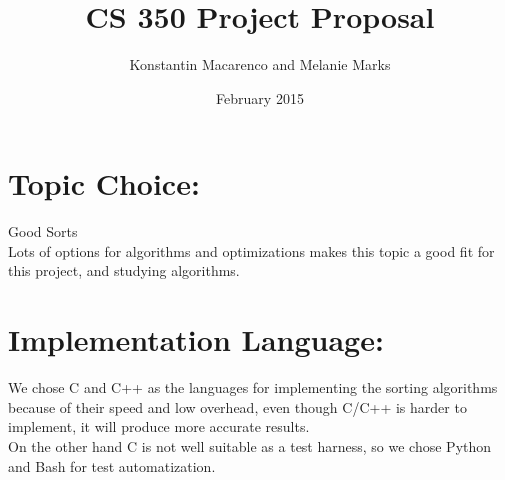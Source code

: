 \documentclass{article}
\title{CS 350 Project Proposal}
\author{Konstantin Macarenco and Melanie Marks }
\date{February 2015}
\begin{document}
\maketitle


%


\noindent
\section*{Topic Choice:}

Good Sorts\\
Lots of options for algorithms and optimizations makes this topic a good fit for this project, and studying algorithms.
\section*{Implementation Language:}

We chose C and C++ as the languages for implementing the sorting algorithms because of their speed and low overhead, even though C/C++ is harder to implement, it will produce more accurate results. \\
On the other hand C is not well suitable as a test harness, so we chose Python and Bash for test automatization.\\

\end{document}
